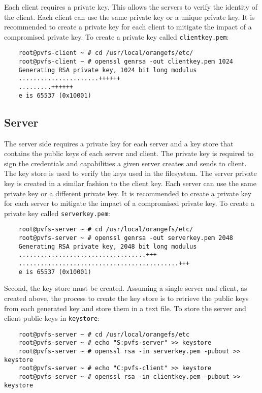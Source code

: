 \documentclass[11pt, letterpaper]{article}
\begin{document}
Each client requires a private key. This allows the servers to verify the 
identity of the client. Each client can use the same private key or a unique 
private key. It is recommended to create a private key for each client to 
mitigate the impact of a compromised private key. To create a private key 
called \texttt{clientkey.pem}:

\begin{verbatim}
    root@pvfs-client ~ # cd /usr/local/orangefs/etc/
    root@pvfs-client ~ # openssl genrsa -out clientkey.pem 1024
    Generating RSA private key, 1024 bit long modulus
    ......................++++++
    .........++++++
    e is 65537 (0x10001)
\end{verbatim}

\subsection{Server}

The server side requires a private key for each server and a key store that 
contains the public keys of each server and client. The private key is 
required to sign the credentials and capabilities a given server creates and 
sends to client. The key store is used to verify the keys used in the 
filesystem. The server private key is created in a similar fashion to the 
client key. Each server can use the same private key or a different private key.
It is recommended to create a private key for each server to mitigate the 
impact of a compromised private key. To create a private key called 
\texttt{serverkey.pem}:

\begin{verbatim}
    root@pvfs-server ~ # cd /usr/local/orangefs/etc/
    root@pvfs-server ~ # openssl genrsa -out serverkey.pem 2048
    Generating RSA private key, 2048 bit long modulus
    ...................................+++
    ............................................+++
    e is 65537 (0x10001)
\end{verbatim}

Second, the key store must be created. Assuming a single server and client, 
as created above, the process to create the key store is to retrieve the public
keys from each generated key and store them in a text file. To store the server
and client public keys in \texttt{keystore}:

\begin{verbatim}
    root@pvfs-server ~ # cd /usr/local/orangefs/etc
    root@pvfs-server ~ # echo "S:pvfs-server" >> keystore
    root@pvfs-server ~ # openssl rsa -in serverkey.pem -pubout >> keystore
    root@pvfs-server ~ # echo "C:pvfs-client" >> keystore
    root@pvfs-server ~ # openssl rsa -in clientkey.pem -pubout >> keystore
\end{verbatim}
\end{document}
